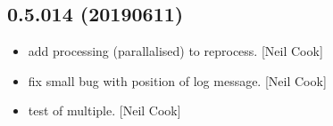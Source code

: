 \documentclass[a4paper,10pt,english]{report}
\begin{document}
\subsection{0.5.014 (2019\sphinxhyphen{}06\sphinxhyphen{}11)}
\label{\detokenize{misc/changelog:id142}}\begin{itemize}
\item {} 
 \sphinxhyphen{} add processing (parallalised) to reprocess. {[}Neil
Cook{]}

\item {} 
 \sphinxhyphen{} fix small bug with position of log message. {[}Neil
Cook{]}

\item {} 
 \sphinxhyphen{} test of multiple. {[}Neil Cook{]}

\end{itemize}
\end{document}
